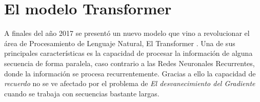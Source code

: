 \section{El modelo Transformer}

A finales del año 2017 se presentó un nuevo modelo que vino a revolucionar el área de Procesamiento
de Lenguaje Natural, El Transformer \cite{Vaswani}. Una de sus principales características es la
capacidad de procesar la información de alguna secuencia de forma paralela, caso contrario a las
Redes Neuronales Recurrentes, donde la información se procesa recurrentemente. Gracias a ello
la capacidad de \textit{recuerdo} no se ve afectado por el problema de \textit{El
desvanecimiento del Gradiente} cuando se trabaja con secuencias bastante largas.


\begin{figure}
    \begin{center}
        \scalebox{0.4}{}
    \end{center}
\end{figure}
